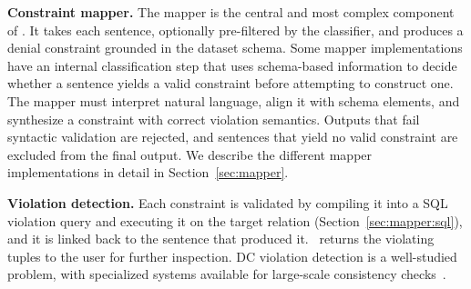 \smallskip\noindent\textbf{Constraint mapper.}
The mapper is the central and most complex component of \system. It takes each sentence, optionally pre-filtered by the classifier, and produces a denial constraint grounded in the dataset schema. Some mapper implementations have an internal classification step that uses schema-based information to decide whether a sentence yields a valid constraint before attempting to construct one.
The mapper must interpret natural language, align it with schema elements, and synthesize a constraint with correct violation semantics. Outputs that fail syntactic validation are rejected, and sentences that yield no valid constraint are excluded from the final output. We describe the different mapper implementations in detail in Section~\ref{sec:mapper}.


\smallskip\noindent\textbf{Violation detection.}
Each constraint is validated by compiling it into a SQL violation query and executing it on the target relation (Section~\ref{sec:mapper:sql}), and it is linked back to the sentence that produced it. \system\ returns the violating tuples to the user for further inspection. DC violation detection is a well-studied problem, with specialized systems available for large-scale consistency checks~\cite{facet2021,liu2024rapidash,youri2024}.

